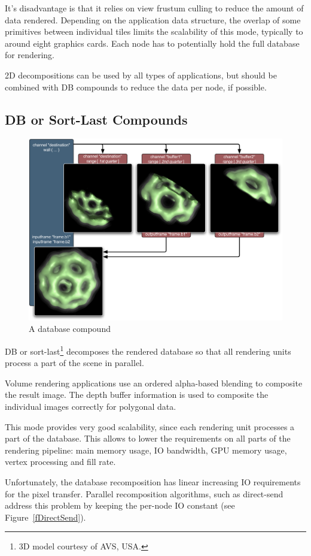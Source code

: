 \documentclass[10pt,a4]{scrartcl}
\newcommand{\fig}[1]{Figure~\ref{#1}}
\begin{document}
It's disadvantage is that it relies on view frustum culling to reduce
the amount of data rendered. Depending on the application data
structure, the overlap of some primitives between individual tiles
limits the scalability of this mode, typically to around eight graphics
cards. Each node has to potentially hold the full database for rendering.

2D decompositions can be used by all types of applications, but should
be combined with DB compounds to reduce the data per node, if possible.


\subsection{DB or Sort-Last Compounds}

\begin{figure}
  \includegraphics[width=.618\textwidth]{images/DB.pdf}
  {\caption{\small A database compound}}
\end{figure}
DB or sort-last\footnote{3D model courtesy of AVS, USA.} decomposes the
rendered database so that all rendering units process a part of the
scene in parallel.

Volume rendering applications use an ordered alpha-based blending to
composite the result image. The depth buffer information is used to
composite the individual images correctly for polygonal data. 

This mode provides very good scalability, since each rendering unit
processes a part of the database. This allows to lower the requirements
on all parts of the rendering pipeline: main memory usage, IO bandwidth,
GPU memory usage, vertex processing and fill rate.

Unfortunately, the database recomposition has linear increasing IO
requirements for the pixel transfer. Parallel recomposition algorithms,
such as direct-send address this problem by keeping the per-node IO
constant (see \fig{fDirectSend}).
\end{document}
